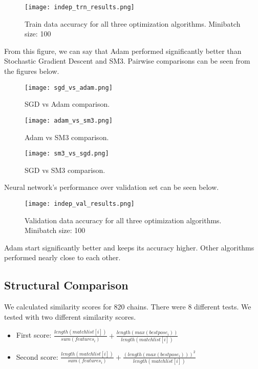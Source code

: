 \documentclass{article}
\begin{document}
\begin{figure}[H]
\centering
\texttt{[image: indep\_trn\_results.png]}
\caption{Train data accuracy for all three optimization algorithms. Minibatch size: 100}
\label{fig:1}
\end{figure}

From this figure, we can say that Adam\citep{kingma2014adam} performed significantly better than Stochastic Gradient Descent and SM3\citep{anil2019memory}. Pairwise comparisons can be seen from the figures below.

\begin{figure}[H]
   \begin{minipage}{0.48\textwidth}
     \centering
     \texttt{[image: sgd\_vs\_adam.png]}
     \caption{SGD vs Adam comparison.}\label{Fig:Data1}
   \end{minipage}\hfill
   \begin{minipage}{0.48\textwidth}
     \centering
     \texttt{[image: adam\_vs\_sm3.png]}
     \caption{Adam vs SM3 comparison.}\label{Fig:Data2}
   \end{minipage}
   \begin{minipage}{0.48\textwidth}
     \centering
     \texttt{[image: sm3\_vs\_sgd.png]}
     \caption{SGD vs SM3 comparison.}\label{Fig:Data2}
   \end{minipage}
\end{figure}

Neural network's performance over validation set can be seen below.

\begin{figure}[H]
\centering
\texttt{[image: indep\_val\_results.png]}
\caption{Validation data accuracy for all three optimization algorithms. Minibatch size: 100}
\label{fig:1}
\end{figure}

Adam start significantly better and keeps its accuracy higher. Other algorithms performed nearly close to each other.

\subsection{Structural Comparison}
We calculated similarity scores for 820 chains. There were 8 different tests. We tested with two different similarity scores.

\begin{itemize}
    \item First score: $\frac{length(matchlist[i])}{sum(features_i)} + \frac{length(max(bestpose_i))}{length(matchlist[i])}$
    \item Second score: $\frac{length(matchlist[i])}{sum(features_i)} + \frac{(length(max(bestpose_i)))^2}{length(matchlist[i])}$
\end{itemize}
\end{document}
